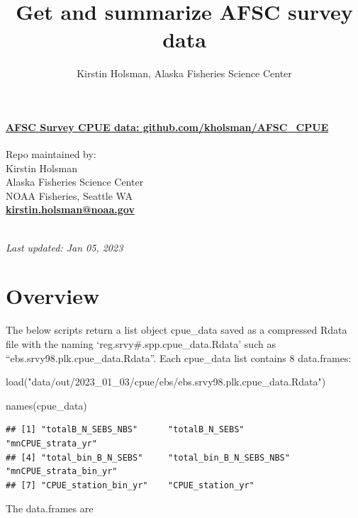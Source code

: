 \documentclass[
]{article}
\title{Get and summarize AFSC survey data}
\author{Kirstin Holsman, Alaska Fisheries Science Center}
\date{}
\newenvironment{Shaded}{\begin{snugshade}}{\end{snugshade}}
\newcommand{\FunctionTok}[1]{\textcolor[rgb]{0.00,0.00,0.00}{#1}}
\newcommand{\NormalTok}[1]{#1}
\newcommand{\StringTok}[1]{\textcolor[rgb]{0.31,0.60,0.02}{#1}}
\begin{document}
\maketitle

{
\setcounter{tocdepth}{2}
\tableofcontents
}
\hypertarget{afsc-survey-cpue-data-github.comkholsmanafsc_cpue}{%
\paragraph{\texorpdfstring{\href{https://github.com/kholsman/AFSC_CPUE}{\textbf{AFSC
Survey CPUE data:
github.com/kholsman/AFSC\_CPUE}}}{AFSC Survey CPUE data: github.com/kholsman/AFSC\_CPUE}}\label{afsc-survey-cpue-data-github.comkholsmanafsc_cpue}}

Repo maintained by:\\
Kirstin Holsman\\
Alaska Fisheries Science Center\\
NOAA Fisheries, Seattle WA\\
\textbf{\url{kirstin.holsman@noaa.gov}}\strut \\
\emph{Last updated: Jan 05, 2023}

\hypertarget{overview}{%
\section{Overview}\label{overview}}

The below scripts return a list object cpue\_data saved as a compressed
Rdata file with the naming `reg.srvy\#.spp.cpue\_data.Rdata' such as
``ebs.srvy98.plk.cpue\_data.Rdata''. Each cpue\_data list contains 8
data.frames:

\begin{Shaded}
\begin{Highlighting}[]
\FunctionTok{load}\NormalTok{(}\StringTok{"data/out/2023\_01\_03/cpue/ebs/ebs.srvy98.plk.cpue\_data.Rdata"}\NormalTok{)}

\FunctionTok{names}\NormalTok{(cpue\_data)}
\end{Highlighting}
\end{Shaded}

\begin{verbatim}
## [1] "totalB_N_SEBS_NBS"      "totalB_N_SEBS"          "mnCPUE_strata_yr"      
## [4] "total_bin_B_N_SEBS"     "total_bin_B_N_SEBS_NBS" "mnCPUE_strata_bin_yr"  
## [7] "CPUE_station_bin_yr"    "CPUE_station_yr"
\end{verbatim}

The data.frames are
\end{document}
